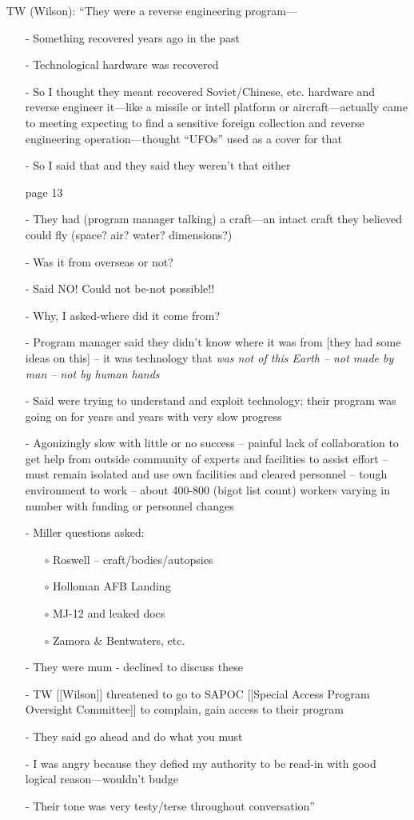 \begin{svgraybox}
\noindent TW (Wilson): ``They were a reverse engineering program---
\begin{enumerate}
\item[-]
Something recovered years ago in the past
\item[-]
Technological hardware was recovered
\item[-]
So I thought they meant recovered Soviet/Chinese, etc. hardware and reverse
engineer it---like a missile or intell platform or aircraft---actually came to
meeting expecting to find a sensitive foreign collection and reverse
engineering operation---thought ``UFOs'' used as a cover for that
\item[-]
So I said that and they said they weren't that either
\item[]page 13
\item[-]
They had (program manager talking) a craft---an intact craft they believed
could fly (space? air? water? dimensions?)
\item[-]  Was it from overseas or not?
\item[-]  Said NO! Could not be-not possible!!
\item[-]  Why, I asked-where did it come from?
\item[-]  Program manager said they didn't know where it was from [they had some ideas on this] -- it was technology that {\it  was not of this Earth -- not made by man -- not by human hands}
\item[-] Said were trying to understand and exploit technology; their program was going on for years and years with very slow progress
\item[-] Agonizingly slow with little or no success -- painful lack of collaboration to get help from outside community of experts and facilities to assist
effort -- must remain isolated and use own facilities and cleared personnel -- tough
environment to work -- about 400-800 (bigot list count) workers varying in number with funding or personnel changes
\item[-] Miller questions asked:\begin{enumerate}
\item[$\circ$] Roswell -- craft/bodies/autopsies
\item[$\circ$] Holloman AFB Landing
\item[$\circ$] MJ-12 and leaked docs
\item[$\circ$] Zamora {\&} Bentwaters, etc.
\end{enumerate}
\item[-] They were mum - declined to discuss these
\item[-] TW [[Wilson]] threatened to go to SAPOC [[Special Access Program Oversight Committee]] to complain, gain access to their program
\item[-] They said go ahead and do what you must
\item[-] I was angry because they defied my authority to be read-in with good logical reason---wouldn't budge
\item[-] Their tone was very testy/terse throughout conversation''
\end{enumerate}


\end{svgraybox}
